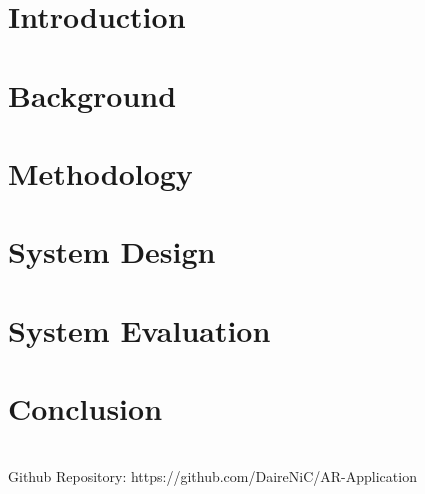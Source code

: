 \documentclass{report}
\begin{document}
 \chapter{Introduction}
 

\chapter{Background}


\chapter{Methodology}



\chapter{System Design}


\chapter{System Evaluation}


\chapter{Conclusion}





\appendix
\chapter{}
Github Repository: https://github.com/DaireNiC/AR-Application
\end{document}
